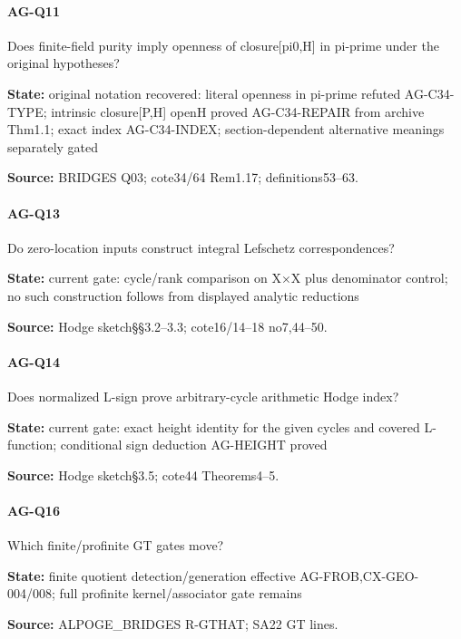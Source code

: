 \documentclass[11pt,a4paper]{article}
\begin{document}
\paragraph{AG-Q11} Does finite-field purity imply openness of closure[pi0,H] in pi-prime under the original hypotheses?

\textbf{State:} original notation recovered:\allowbreak{} literal openness in pi-prime refuted AG-C34-TYPE; intrinsic closure[P,H] openH proved AG-C34-REPAIR from archive Thm1.\allowbreak{}1; exact index AG-C34-INDEX; section-dependent alternative meanings separately gated

\textbf{Source:} BRIDGES Q03; cote34/\allowbreak{}64 Rem1.\allowbreak{}17; definitions53–\allowbreak{}63.

\paragraph{AG-Q13} Do zero-location inputs construct integral Lefschetz correspondences?

\textbf{State:} current gate:\allowbreak{} cycle/\allowbreak{}rank comparison on X×X plus denominator control; no such construction follows from displayed analytic reductions

\textbf{Source:} Hodge sketch§§3.\allowbreak{}2–\allowbreak{}3.\allowbreak{}3; cote16/\allowbreak{}14–\allowbreak{}18 no7,44–\allowbreak{}50.

\paragraph{AG-Q14} Does normalized L-sign prove arbitrary-cycle arithmetic Hodge index?

\textbf{State:} current gate:\allowbreak{} exact height identity for the given cycles and covered L-function; conditional sign deduction AG-HEIGHT proved

\textbf{Source:} Hodge sketch§3.\allowbreak{}5; cote44 Theorems4–\allowbreak{}5.

\paragraph{AG-Q16} Which finite/\allowbreak{}profinite GT gates move?

\textbf{State:} finite quotient detection/\allowbreak{}generation effective AG-FROB,CX-GEO-004/\allowbreak{}008; full profinite kernel/\allowbreak{}associator gate remains

\textbf{Source:} ALPOGE\_\allowbreak{}BRIDGES R-GTHAT; SA22 GT lines.
\end{document}
